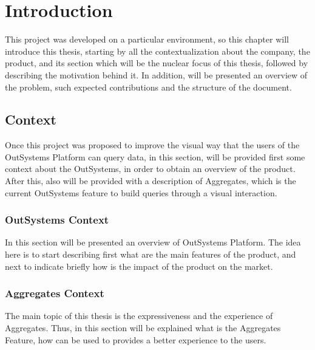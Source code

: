 \newcommand{\novathesis}{\emph{novathesis}}
\newcommand{\novathesisclass}{\texttt{novathesis.cls}}


\chapter{Introduction}
\label{cha:introduction}
This project was developed on a particular environment, so this chapter will 
introduce this thesis, starting by all the contextualization about the company, 
the product, and its section which will be the nuclear focus of this thesis, 
followed by describing the motivation behind it. In addition, will be presented 
an overview of the problem, such expected contributions and the structure of the 
document. 

\section{Context} 
\label{sec:context}
Once this project was proposed to improve the visual way that the users of the 
OutSystems Platform can query data, in this section, will be provided first some 
context about the OutSystems, in order to obtain an overview of the product. 
After this, also will be provided with a description of Aggregates, which is the 
current OutSystems feature to build queries through a visual interaction.

\subsection{OutSystems Context}
\label{subsec:outsystems_context}
In this section will be presented an overview of OutSystems Platform. The idea
here is to start describing first what are the main features of the product, and 
next to indicate briefly how is the impact of the product on the market.

\subsection{Aggregates Context}
\label{subsec:aggregates_context}
The main topic of this thesis is the expressiveness and the experience of 
Aggregates. Thus, in this section will be explained what is the Aggregates Feature, 
how can be used to provides a better experience to the users.


